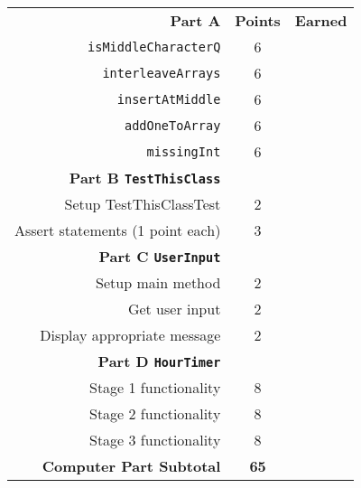 \documentclass[12pt,twoside]{article}
\newcommand{\fillInBlank}[1][0.5in]{\underline{\hspace{#1}}}
\newcommand{\code}[1]{\texttt{#1}}
\begin{document}
\begin{flushright}
\begin{tabular}{rcc}
\textbf{Part A} & \textbf{Points} & \textbf{Earned} \\
\code{isMiddleCharacterQ} & 6 & \fillInBlank\\
\code{interleaveArrays} & 6 & \fillInBlank\\
\code{insertAtMiddle} & 6 & \fillInBlank\\
\code{addOneToArray} & 6 & \fillInBlank\\
\code{missingInt} & 6 & \fillInBlank\\
\textbf{Part B \code{TestThisClass}} &  & \\
Setup TestThisClassTest & 2 & \fillInBlank \\
Assert statements (1 point each) & 3 & \fillInBlank \\
\textbf{Part C \code{UserInput}} &  & \\
Setup main method  & 2 & \fillInBlank \\
Get user input  & 2 & \fillInBlank \\
Display appropriate message & 2 & \fillInBlank \\
\textbf{Part D \code{HourTimer}} &  & \\
Stage 1 functionality  & 8 & \fillInBlank \\
Stage 2 functionality & 8 & \fillInBlank \\
Stage 3 functionality & 8 & \fillInBlank \\
\textbf{Computer Part Subtotal} & \textbf{65} & \fillInBlank
\end{tabular}
\end{flushright}
\end{document}
